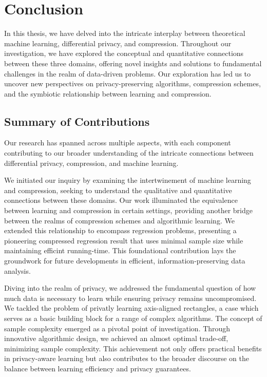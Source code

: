 
\chapter{Conclusion}
\label{chp:conclusion}
In this thesis, we have delved into the intricate interplay between theoretical machine learning, differential privacy, and compression. Throughout our investigation, we have explored the conceptual and quantitative connections between these three domains, offering novel insights and solutions to fundamental challenges in the realm of data-driven problems. Our exploration has led us to uncover new perspectives on privacy-preserving algorithms, compression schemes, and the symbiotic relationship between learning and compression.

\section{Summary of Contributions}
\label{sec:conclusion:contributions}
Our research has spanned across multiple aspects, with each component contributing to our broader understanding of the intricate connections between differential privacy, compression, and machine learning.

We initiated our inquiry by examining the intertwinement of machine learning and compression, seeking to understand the qualitative and quantitative connections between these domains. Our work illuminated the equivalence between learning and compression in certain settings, providing another bridge between the realms of compression schemes and algorithmic learning. We extended this relationship to encompass regression problems, presenting a pioneering compressed regression result that uses minimal sample size while maintaining efficint running-time. This foundational contribution lays the groundwork for future developments in efficient, information-preserving data analysis.

Diving into the realm of privacy, we addressed the fundamental question of how much data is necessary to learn while ensuring privacy remains uncompromised. We tackled the problem of privatly learning axis-aligned rectangles, a case which serves as a basic building block for a range of complex algorithms. The concept of sample complexity emerged as a pivotal point of investigation. Through innovative algorithmic design, we achieved an almost optimal trade-off, minimizing sample complexity. This achievement not only offers practical benefits in privacy-aware learning but also contributes to the broader discourse on the balance between learning efficiency and privacy guarantees.

